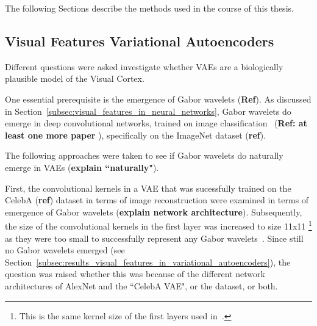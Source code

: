 The following Sections describe the methods used in the course of this thesis.

\subsection{Visual Features Variational Autoencoders}\label{subsec:visual-features-variational-autoencoders}
Different questions were asked investigate whether \acp{VAE} are a biologically plausible model of the Visual Cortex.

One essential prerequisite is the emergence of Gabor wavelets (\textbf{Ref}).
As discussed in Section~\ref{subsec:visual_features_in_neural_networks}, Gabor wavelets do emerge in deep convolutional networks, trained on image classification~\citep{krizhevsky2012imagenet} (\textbf{Ref: at least one more paper }), specifically on the ImageNet dataset (\textbf{ref}).\par
The following approaches were taken to see if Gabor wavelets do naturally emerge in \acp{VAE} (\textbf{explain ``naturally"}).\par
First, the convolutional kernels in a \ac{VAE} that was sucessfully trained on the CelebA (\textbf{ref}) dataset in terms of image reconstruction were examined in terms of emergence of Gabor wavelets (\textbf{explain network architecture}).
Subsequently, the size of the convolutional kernels in the first layer was increased to size 11x11 \footnote{This is the same kernel size of the first layers used in~\citet{krizhevsky2012imagenet}.} as they were too small to successfully represent any Gabor wavelets~\citep{han2019variational}.
Since still no Gabor wavelets emerged (see Section~\ref{subsec:results_visual_features_in_variational_autoencoders}), the question was raised whether this was because of the different network architectures of AlexNet and the ``CelebA VAE", or the dataset, or both.

